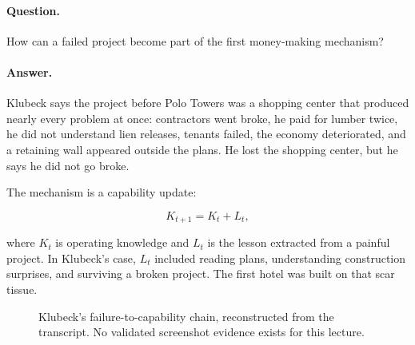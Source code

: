 \documentclass[11pt,oneside]{book}
\begin{document}
\paragraph{Question.}
How can a failed project become part of the first money-making mechanism?

\paragraph{Answer.}
Klubeck says the project before Polo Towers was a shopping center that produced nearly every problem at once: contractors went broke, he paid for lumber twice, he did not understand lien releases, tenants failed, the economy deteriorated, and a retaining wall appeared outside the plans. He lost the shopping center, but he says he did not go broke.

The mechanism is a capability update:

\begin{equation}
K_{t+1}=K_t+L_t,
\end{equation}

where \(K_t\) is operating knowledge and \(L_t\) is the lesson extracted from a painful project. In Klubeck's case, \(L_t\) included reading plans, understanding construction surprises, and surviving a broken project. The first hotel was built on that scar tissue.

\begin{figure}
\centering
{}
\caption{Klubeck's failure-to-capability chain, reconstructed from the transcript. No validated screenshot evidence exists for this lecture.}
\end{figure}
\end{document}
